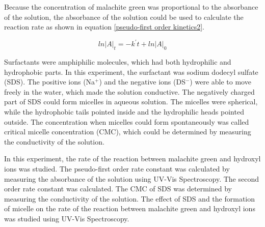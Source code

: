 \documentclass[twocolumn]{article} %
\begin{document}
Because the concentration of malachite green was proportional to the absorbance of the solution, the absorbance of the solution could be used to calculate the reaction rate as shown in equation \ref{pseudo-first order kinetics2}. 

\begin{equation}
    \label{pseudo-first order kinetics2}
    ln \left | A \right |_t = -k ^{\prime} t + ln\left | A \right | _0
\end{equation}

Surfactants were amphiphilic molecules, which had both hydrophilic and hydrophobic parts. In this experiment, the surfactant was sodium dodecyl sulfate (SDS). The positive ions (Na$^+$) and the negative ions (DS$^-$) were able to move freely in the water, which made the solution conductive. 
The negatively charged part of SDS could form micelles in aqueous solution. The micelles were spherical, while the hydrophobic tails pointed inside and the hydrophilic heads pointed outside. The concentration when micelles could form spontaneously was called critical micelle concentration (CMC), which could be determined by measuring the conductivity of the solution.






In this experiment, the rate of the reaction between malachite green and hydroxyl ions was studied. The pseudo-first order rate constant was calculated by measuring the absorbance of the solution using UV-Vis Spectroscopy. The second order rate constant was calculated. The CMC of SDS was determined by measuring the conductivity of the solution. The effect of SDS and the formation of micelle on the rate of the reaction between malachite green and hydroxyl ions was studied using UV-Vis Spectroscopy.
\end{document}
